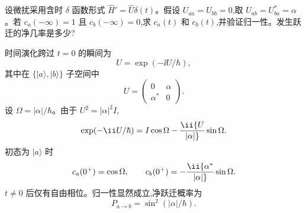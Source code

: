 \begin{question}
设微扰采用含时 $\delta$ 函数形式 $\hat H'=\hat U\delta(t)$。假设 $U_{aa}=U_{bb}=0$,取 $U_{ab}=U_{ba}^*=\alpha$。若 $c_a(-\infty)=1$ 且 $c_b(-\infty)=0$,求 $c_a(t)$ 和 $c_b(t)$,并验证归一性。发生跃迁的净几率是多少?
\end{question}
\begin{solution}
时间演化跨过 $t=0$ 的瞬间为
\[
U=\exp(-\ii U/\hbar),
\]
其中在 $\{|a\rangle,|b\rangle\}$ 子空间中
\[
U=\begin{pmatrix}0&\alpha\\ \alpha^*&0\end{pmatrix}.
\]
设 $\Omega=|\alpha|/\hbar$。由于 $U^2=|\alpha|^2 I$,
\[
\exp(-\ii U/\hbar)=I\cos\Omega-\ii {U\over|\alpha|}\sin\Omega.
\]
初态为 $|a\rangle$ 时
\[
c_a(0^+)=\cos\Omega,
\qquad
c_b(0^+)=-\ii {\alpha^*\over|\alpha|}\sin\Omega.
\]
$t\ne0$ 后仅有自由相位。归一性显然成立,净跃迁概率为
\[
\boxed{P_{a\to b}=\sin^2(|\alpha|/\hbar).}
\]
\end{solution}

